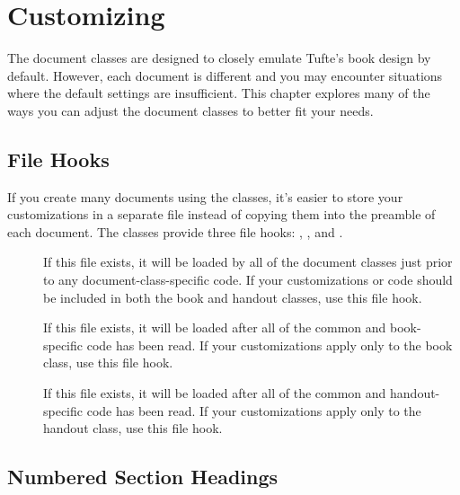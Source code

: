 \chapter[Customizing Tufte-LaTeX]{Customizing \TL}
\label{ch:customizing}

The \TL document classes are designed to closely emulate Tufte's book
design by default.  However, each document is different and you may encounter
situations where the default settings are insufficient.  This chapter explores
many of the ways you can adjust the \TL document classes to better fit
your needs.

\section{File Hooks}
\label{sec:filehooks}

If you create many documents using the \TL classes, it's easier to
store your customizations in a separate file instead of copying them into the
preamble of each document.  The \TL classes provide three file hooks:
, , and
.\sloppy

\begin{description}
	\item[]
	If this file exists, it will be loaded by all of the \TL document
	classes just prior to any document-class-specific code.  If your
	customizations or code should be included in both the book and handout
	classes, use this file hook.
	\item[] 
	If this file exists, it will be loaded after all of the common and
	book-specific code has been read.  If your customizations apply only to the
	book class, use this file hook.
	\item[] 
	If this file exists, it will be loaded after all of the common and
	handout-specific code has been read.  If your customizations apply only to
	the handout class, use this file hook.
\end{description}


\section{Numbered Section Headings}
\label{sec:numbered-sections}

